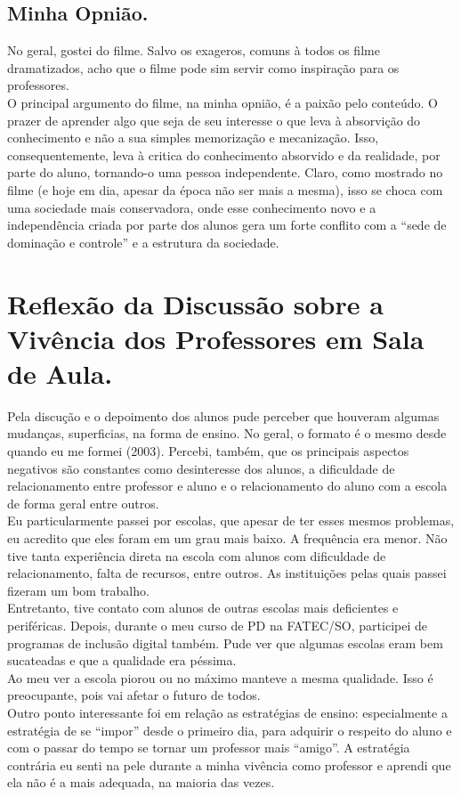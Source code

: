 \documentclass[a4paper,12pt]{article}
\begin{document}
\subsection{Minha Opnião.}
No geral, gostei do filme. Salvo os exageros, comuns à todos os filme dramatizados, acho que o filme pode sim servir como inspiração para os professores.\\
O principal argumento do filme, na minha opnião, é a paixão pelo conteúdo. O prazer de aprender algo que seja de seu interesse o que leva à absorvição do conhecimento e não a sua simples memorização e mecanização. Isso, consequentemente, leva à critica do conhecimento absorvido e da realidade, por parte do aluno, tornando-o uma pessoa independente. Claro, como mostrado no filme (e hoje em dia, apesar da época não ser mais a mesma), isso se choca com uma sociedade mais conservadora, onde esse conhecimento novo e a independência criada por parte dos alunos gera um forte conflito com a ``sede de dominação e controle'' e a estrutura da sociedade.

\section{Reflexão da Discussão sobre a Vivência dos Professores em Sala de Aula.}

Pela discução e o depoimento dos alunos pude perceber que houveram algumas mudanças, superficias, na forma de ensino. No geral, o formato é o mesmo desde quando eu me formei (2003). Percebi, também, que os principais aspectos negativos são constantes como desinteresse dos alunos, a dificuldade de relacionamento entre professor e aluno e o relacionamento do aluno com a escola de forma geral entre outros.\\
Eu particularmente passei por escolas, que apesar de ter esses mesmos problemas, eu acredito que eles foram em um grau mais baixo. A frequência era menor. Não tive tanta experiência direta na escola com alunos com dificuldade de relacionamento, falta de recursos, entre outros. As instituições pelas quais passei fizeram um bom trabalho.\\
Entretanto, tive contato com alunos de outras escolas mais deficientes e periféricas. Depois, durante o meu curso de PD na FATEC/SO, participei de programas de inclusão digital também. Pude ver que algumas escolas eram bem sucateadas e que a qualidade era péssima.\\
Ao meu ver a escola piorou ou no máximo manteve a mesma qualidade. Isso é preocupante, pois vai afetar o futuro de todos.\\
Outro ponto interessante foi em relação as estratégias de ensino: especialmente a estratégia de se ``impor'' desde o primeiro dia, para adquirir o respeito do aluno e com o passar do tempo se tornar um professor mais ``amigo''. A estratégia contrária eu senti na pele durante a minha vivência como professor e aprendi que ela não é a mais adequada, na maioria das vezes.\\
\end{document}
